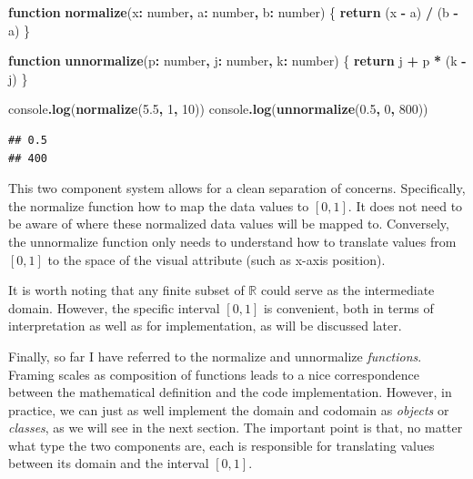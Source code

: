 \documentclass[
]{book}
\newenvironment{Shaded}{\begin{snugshade}}{\end{snugshade}}
\newcommand{\BuiltInTok}[1]{#1}
\newcommand{\ControlFlowTok}[1]{\textcolor[rgb]{0.13,0.29,0.53}{\textbf{#1}}}
\newcommand{\DataTypeTok}[1]{\textcolor[rgb]{0.13,0.29,0.53}{#1}}
\newcommand{\DecValTok}[1]{\textcolor[rgb]{0.00,0.00,0.81}{#1}}
\newcommand{\FloatTok}[1]{\textcolor[rgb]{0.00,0.00,0.81}{#1}}
\newcommand{\FunctionTok}[1]{\textcolor[rgb]{0.13,0.29,0.53}{\textbf{#1}}}
\newcommand{\KeywordTok}[1]{\textcolor[rgb]{0.13,0.29,0.53}{\textbf{#1}}}
\newcommand{\NormalTok}[1]{#1}
\newcommand{\OperatorTok}[1]{\textcolor[rgb]{0.81,0.36,0.00}{\textbf{#1}}}
\theoremstyle{definition}
\theoremstyle{definition}
\theoremstyle{definition}
\theoremstyle{definition}
\theoremstyle{remark}
\begin{document}
\begin{Shaded}
\begin{Highlighting}[]
\KeywordTok{function} \FunctionTok{normalize}\NormalTok{(x}\OperatorTok{:} \DataTypeTok{number}\OperatorTok{,}\NormalTok{ a}\OperatorTok{:} \DataTypeTok{number}\OperatorTok{,}\NormalTok{ b}\OperatorTok{:} \DataTypeTok{number}\NormalTok{) \{}
  \ControlFlowTok{return}\NormalTok{ (x }\OperatorTok{{-}}\NormalTok{ a) }\OperatorTok{/}\NormalTok{ (b }\OperatorTok{{-}}\NormalTok{ a)}
\NormalTok{\}}

\KeywordTok{function} \FunctionTok{unnormalize}\NormalTok{(p}\OperatorTok{:} \DataTypeTok{number}\OperatorTok{,}\NormalTok{ j}\OperatorTok{:} \DataTypeTok{number}\OperatorTok{,}\NormalTok{ k}\OperatorTok{:} \DataTypeTok{number}\NormalTok{) \{}
 \ControlFlowTok{return}\NormalTok{ j }\OperatorTok{+}\NormalTok{ p }\OperatorTok{*}\NormalTok{ (k }\OperatorTok{{-}}\NormalTok{ j) }
\NormalTok{\}}

\BuiltInTok{console}\OperatorTok{.}\FunctionTok{log}\NormalTok{(}\FunctionTok{normalize}\NormalTok{(}\FloatTok{5.5}\OperatorTok{,} \DecValTok{1}\OperatorTok{,} \DecValTok{10}\NormalTok{))}
\BuiltInTok{console}\OperatorTok{.}\FunctionTok{log}\NormalTok{(}\FunctionTok{unnormalize}\NormalTok{(}\FloatTok{0.5}\OperatorTok{,} \DecValTok{0}\OperatorTok{,} \DecValTok{800}\NormalTok{))}
\end{Highlighting}
\end{Shaded}

\begin{verbatim}
## 0.5
## 400
\end{verbatim}

This two component system allows for a clean separation of concerns. Specifically, the normalize function how to map the data values to \([0, 1]\). It does not need to be aware of where these normalized data values will be mapped to. Conversely, the unnormalize function only needs to understand how to translate values from \([0, 1]\) to the space of the visual attribute (such as x-axis position).

It is worth noting that any finite subset of \(\mathbb{R}\) could serve as the intermediate domain. However, the specific interval \([0, 1]\) is convenient, both in terms of interpretation as well as for implementation, as will be discussed later.

Finally, so far I have referred to the normalize and unnormalize \emph{functions}. Framing scales as composition of functions leads to a nice correspondence between the mathematical definition and the code implementation. However, in practice, we can just as well implement the domain and codomain as \emph{objects} or \emph{classes}, as we will see in the next section. The important point is that, no matter what type the two components are, each is responsible for translating values between its domain and the interval \([0, 1]\).
\end{document}
